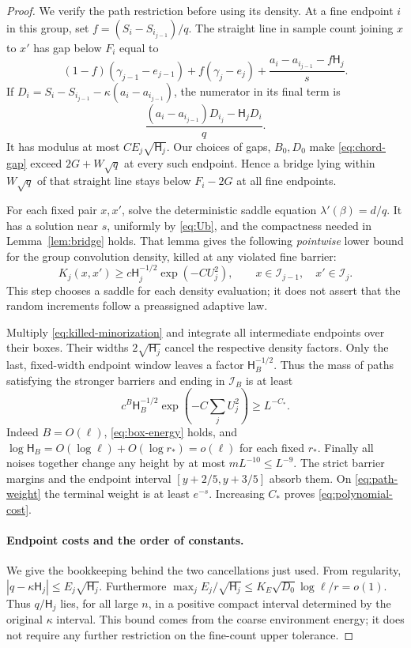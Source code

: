 \documentclass[11pt]{article}
\theoremstyle{definition}\newtheorem{definition}[theorem]{Definition}
\theoremstyle{remark}\newtheorem{remark}[theorem]{Remark}
\numberwithin{equation}{section}\allowdisplaybreaks
\begin{document}
\begin{proof}
We verify the path restriction before using its density. At a fine
endpoint $i$ in this group, set
$f=(S_i-S_{i_{j-1}})/q$. The straight line in sample count joining $x$
to $x'$ has gap below $F_i$ equal to
\begin{equation}\label{eq:chord-gap}
 (1-f)(\gamma_{j-1}-e_{j-1})+f(\gamma_j-e_j)
       +\frac{a_i-a_{i_{j-1}}-f\mathsf H_j}{s}.
\end{equation}
If $D_i=S_i-S_{i_{j-1}}-\kappa(a_i-a_{i_{j-1}})$, the numerator
in its final term is
\[
 \frac{(a_i-a_{i_{j-1}})D_{i_j}-\mathsf H_jD_i}{q}.
\]
It has modulus at most $CE_j\sqrt{\mathsf H_j}$.
Our choices of gaps, $B_0,D_0$ make \eqref{eq:chord-gap} exceed
$2G+W\sqrt q$ at every such endpoint. Hence a bridge lying within
$W\sqrt q$ of that straight line stays below $F_i-2G$ at all fine
endpoints.

For each fixed pair $x,x'$, solve the deterministic saddle equation
$\lambda'(\beta)=d/q$. It has a solution near $s$, uniformly by
\eqref{eq:Ub}, and the compactness needed in Lemma~\ref{lem:bridge}
holds. That lemma gives the following \emph{pointwise} lower bound for
the group convolution density, killed at any violated fine barrier:
\begin{equation}\label{eq:killed-minorization}
 K_j(x,x')\ge c\mathsf H_j^{-1/2}\exp(-CU_j^2),
 \qquad x\in\mathcal I_{j-1},\quad x'\in\mathcal I_j.
\end{equation}
This step chooses a saddle for each density evaluation; it does not
assert that the random increments follow a preassigned adaptive law.

Multiply \eqref{eq:killed-minorization} and integrate all intermediate
endpoints over their boxes. Their widths $2\sqrt{\mathsf H_j}$ cancel
the respective density factors. Only the last, fixed-width endpoint
window leaves a factor $\mathsf H_B^{-1/2}$. Thus the mass of paths
satisfying the stronger barriers and ending in $\mathcal I_B$ is at least
\[
 c^B\mathsf H_B^{-1/2}\exp\left(-C\sum_jU_j^2\right)\ge L^{-C_*}.
\]
Indeed $B=O(\ell)$, \eqref{eq:box-energy} holds, and
$\log\mathsf H_B=O(\log\ell)+O(\log r_*)=o(\ell)$ for each fixed $r_*$.
Finally all noises together change any height by at most $mL^{-10}\le
L^{-9}$. The strict barrier margins and the endpoint interval
$[y+2/5,y+3/5]$ absorb them. On \eqref{eq:path-weight} the terminal
weight is at least $e^{-s}$. Increasing $C_*$ proves
\eqref{eq:polynomial-cost}.

\paragraph{Endpoint costs and the order of constants.}
We give the bookkeeping behind the two cancellations just used.
From regularity,
$|q-\kappa\mathsf H_j|\le E_j\sqrt{\mathsf H_j}$.
Furthermore
$\max_j E_j/\sqrt{\mathsf H_j}
 \le K_E\sqrt{D_0}\log\ell/r=o(1)$.
Thus $q/\mathsf H_j$ lies, for all large $n$, in a positive compact
interval determined by the original $\kappa$ interval. This bound
comes from the coarse environment energy; it does not require
any further restriction on the fine-count upper tolerance.


\end{proof}
\end{document}
